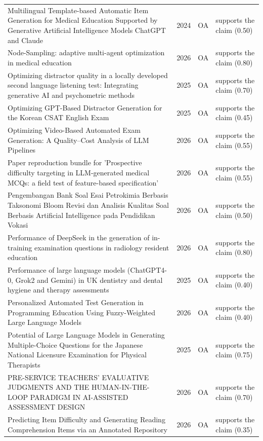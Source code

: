 \begin{longtable}{@{}%
  >{\raggedright\arraybackslash}p{}c%
  >{\raggedright\arraybackslash}p{}%
  >{\raggedright\arraybackslash}p{}@{}}
Multilingual Template-based Automatic Item Generation for Medical Education Supported by Generative Artificial Intelligence Models ChatGPT and Claude & 2024 & OA & supports the claim (0.50) \\
Node-Sampling: adaptive multi-agent optimization in medical education & 2026 & OA & supports the claim (0.80) \\
Optimizing distractor quality in a locally developed second language listening test: Integrating generative AI and psychometric methods & 2025 & OA & supports the claim (0.70) \\
Optimizing GPT-Based Distractor Generation for the Korean CSAT English Exam & 2025 & OA & supports the claim (0.45) \\
Optimizing Video-Based Automated Exam Generation: A Quality--Cost Analysis of LLM Pipelines & 2026 & OA & supports the claim (0.55) \\
Paper reproduction bundle for 'Prospective difficulty targeting in LLM-generated medical MCQs: a field test of feature-based specification' & 2026 & OA & supports the claim (0.55) \\
Pengembangan Bank Soal Esai Petrokimia Berbasis Taksonomi Bloom Revisi dan Analisis Kualitas Soal Berbasis Artificial Intelligence pada Pendidikan Vokasi & 2026 & OA & supports the claim (0.50) \\
Performance of DeepSeek in the generation of in-training examination questions in radiology resident education & 2026 & OA & supports the claim (0.80) \\
Performance of large language models (ChatGPT4-0, Grok2 and Gemini) in UK dentistry and dental hygiene and therapy assessments & 2025 & OA & supports the claim (0.40) \\
Personalized Automated Test Generation in Programming Education Using Fuzzy-Weighted Large Language Models & 2026 & OA & supports the claim (0.40) \\
Potential of Large Language Models in Generating Multiple-Choice Questions for the Japanese National Licensure Examination for Physical Therapists & 2025 & OA & supports the claim (0.75) \\
PRE-SERVICE TEACHERS' EVALUATIVE JUDGMENTS AND THE \textquotedbl{}HUMAN-IN-THE-LOOP\textquotedbl{} PARADIGM IN AI-ASSISTED ASSESSMENT DESIGN & 2026 & OA & supports the claim (0.70) \\
Predicting Item Difficulty and Generating Reading Comprehension Items via an Annotated Repository & 2026 & OA & supports the claim (0.35) \\

\end{longtable}
